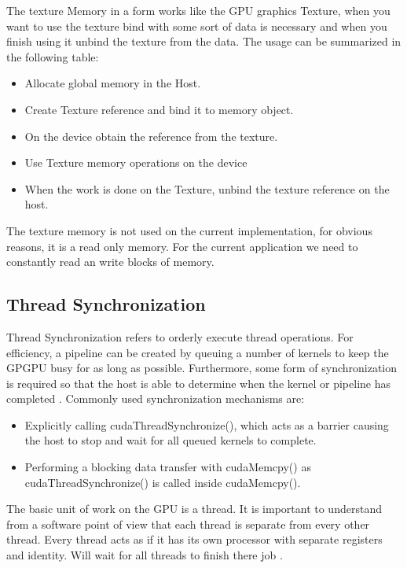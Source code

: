 The texture Memory in a form works like the GPU graphics Texture, when you want to use the texture bind with some sort of data is necessary and when you finish using it unbind the texture from the data. The usage can be summarized in the following table:

\begin{itemize}
\item Allocate global memory in the Host.
\item Create Texture reference and bind it to memory object.
\item On the device obtain the reference from the texture.
\item  Use Texture memory operations on the device
\item  When the work is done on the Texture, unbind the texture reference on the host.
\end{itemize}


The texture memory is not used on the current implementation, for obvious reasons, it is a read only memory. For the current application we need to constantly read an write blocks of memory.

\subsection{Thread Synchronization}

Thread Synchronization refers to orderly execute thread operations. For efficiency, a pipeline can be created by queuing a number of kernels to keep the GPGPU busy for as long as possible. Furthermore, some form of synchronization is required so that the host is able to determine when the kernel or pipeline has completed \cite{design}. Commonly used synchronization mechanisms are:

\begin{itemize}
  \item Explicitly calling {\listf cudaThreadSynchronize()}, which acts as a barrier causing the host to stop and wait for all queued kernels to complete.
  \item Performing a blocking data transfer with {\listf cudaMemcpy()} as {\listf cudaThreadSynchronize()} is called inside {\listf cudaMemcpy()}.
\end{itemize}

The basic unit of work on the GPU is a thread. It is important to understand from a software point of view that each thread is separate from every other thread. Every thread acts as if it has its own processor with separate registers and identity. Will wait for all threads to finish there job \cite{design}.


